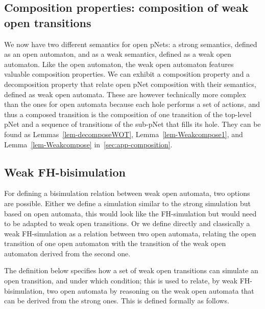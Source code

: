 \documentclass{lmcs}
\begin{document}
\subsection{Composition properties: composition of weak open transitions}
We now have two different semantics for open pNets: a strong semantics, defined  as an open automaton, and as a weak semantics, defined as a weak open automaton. Like the open automaton, the weak open automaton features valuable composition properties. We can exhibit  a composition property and a decomposition property that relate open pNet composition with their semantics, defined as weak open automata. These are however technically more complex than the ones for open automata because each hole performs a set of actions, and thus a composed transition is the composition of one transition of the top-level pNet and a sequence of transitions of the sub-pNet that fills its hole. They can be found as Lemmas~\ref{lem-decomposeWOT}, Lemma~\ref{lem-Weakcompose1}, and Lemma~\ref{lem-Weakcompose} in~\ref{sec:app-composition}.



\subsection{Weak FH-bisimulation}
For defining a bisimulation relation between weak open automata, two options are possible. Either we define a simulation similar to the strong simulation but based on open automata, this would look like the FH-simulation but would need to be adapted to weak open transitions. Or we define directly and classically a weak FH-simulation as a relation between two open automata, relating the open transition of one open automaton with the transition of the weak open automaton derived from the second one. 

The definition below specifies how a set of weak open transitions can simulate an open transition, and under which condition; this is used to relate, by weak FH-bisimulation, two open automata by reasoning on the weak open automata that can be derived from the strong ones.
This is defined formally as follows.
\end{document}
